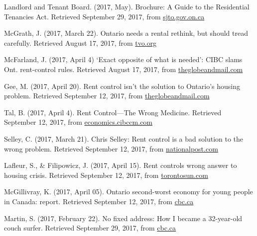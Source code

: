 \begin{thebibliography}{9}

 Landlord and Tenant Board. (2017, May). Brochure: A Guide to the Residential Tenancies Act. Retrieved September 29, 2017, from \href{http://www.sjto.gov.on.ca/documents/ltb/Brochures/Guide\%20to\%20RTA\%20(English).html}{sjto.gov.on.ca}

  McGrath, J. (2017, March 22). Ontario needs a rental rethink, but should tread carefully. Retrieved August 17, 2017, from \href{https://tvo.org/article/current-affairs/ontario-needs-a-rental-rethink-but-should-tread-carefully}{tvo.org}

  McFarland, J. (2017, April 4) `Exact opposite of what is needed': CIBC slams Ont. rent-control rules. Retrieved August 17, 2017, from \href{https://www.theglobeandmail.com/real-estate/toronto/new-ontario-rent-control-rules-exact-opposite-of-what-is-needed-analyst-warns/article34569276/}{theglobeandmail.com}


 Gee, M. (2017, April 20). Rent control isn't the solution to Ontario's housing problem. Retrieved September 12, 2017, from \href{https://beta.theglobeandmail.com/news/toronto/rent-control-isnt-the-solution-to-ontarios-housing-problem/article34753102/}{theglobeandmail.com}

 Tal, B. (2017, April 4). Rent Control—The Wrong Medicine. Retrieved September 12, 2017, from \href{https://economics.cibccm.com/economicsweb/cds?ID=2595&TYPE=EC_PDF}{economics.cibccm.com}

 Selley, C. (2017, March 21). Chris Selley: Rent control is a bad solution to the wrong problem. Retrieved September 12, 2017, from \href{http://nationalpost.com/news/toronto/chris-selley-rent-control-is-a-bad-solution-to-the-wrong-problem}{nationalpost.com}

 Lafleur, S., \& Filipowicz, J. (2017, April 15). Rent controls wrong answer to housing crisis. Retrieved September 12, 2017, from \href{http://www.torontosun.com/2017/04/15/rent-controls-wrong-answer-to-housing-crisis}{torontosun.com}

  McGillivray, K. (2017, April 05). Ontario second-worst economy for young people in Canada: report. Retrieved September 12, 2017, from \href{http://www.cbc.ca/news/canada/toronto/generation-squeeze-ontario-economy-1.4054589}{cbc.ca}
  
  Martin, S. (2017, February 22). No fixed address: How I became a 32-year-old couch surfer. Retrieved September 29, 2017, from \href{http://www.cbc.ca/news/canada/toronto/no-fixed-address-how-i-became-a-32-year-old-couch-surfer-1.3985771}{cbc.ca}


\end{thebibliography}
